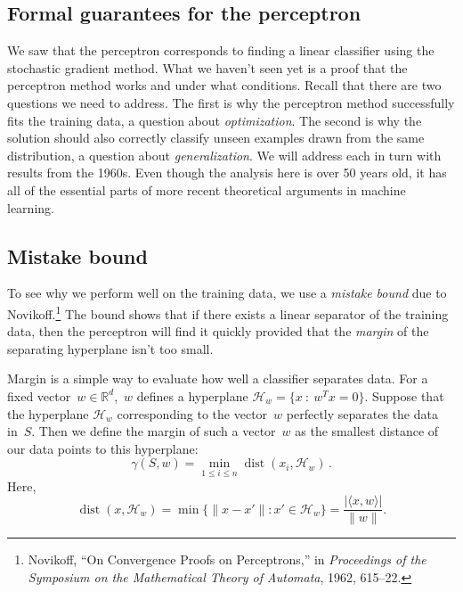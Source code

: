 \documentclass{tufte-book}
\begin{document}
\hypertarget{formal-guarantees-for-the-perceptron}{%
\subsection{Formal guarantees for the
perceptron}\label{formal-guarantees-for-the-perceptron}}

We saw that the perceptron corresponds to finding a linear classifier
using the stochastic gradient method. What we haven't seen yet is a
proof that the perceptron method works and under what conditions. Recall
that there are two questions we need to address. The first is why the
perceptron method successfully fits the training data, a question about
\emph{optimization}. The second is why the solution should also
correctly classify unseen examples drawn from the same distribution, a
question about \emph{generalization}. We will address each in turn with
results from the 1960s. Even though the analysis here is over 50 years
old, it has all of the essential parts of more recent theoretical
arguments in machine learning.

\hypertarget{mistake-bound}{%
\subsection{Mistake bound}\label{mistake-bound}}


To see why we perform well on the training data, we use a \emph{mistake
bound} due to Novikoff.\footnote{Novikoff, {``On Convergence Proofs on
  Perceptrons,''} in \emph{Proceedings of the Symposium on the
  Mathematical Theory of Automata}, 1962, 615--22.} The bound shows that
if there exists a linear separator of the training data, then the
perceptron will find it quickly provided that the \emph{margin} of the
separating hyperplane isn't too small.

Margin is a simple way to evaluate how well a classifier separates data.
For a fixed vector~\(w\in \mathbb{R}^d\),~\(w\) defines a hyperplane
\(\mathcal{H}_w = \{x~:~w^Tx=0\}\). Suppose that the hyperplane
\(\mathcal{H}_w\) corresponding to the vector~\(w\) perfectly separates
the data in~\(S\). Then we define the margin of such a vector~\(w\) as
the smallest distance of our data points to this hyperplane: \[
  \gamma(S,w) = \min_{1\le i\le n} \operatorname{dist}(x_i,\mathcal{H}_w )\,.
\] Here, \[
\operatorname{dist}(x, \mathcal{H}_w) = \min\{ \|x - x'\| \colon x'\in \mathcal{H}_w\}
= \frac{|\langle x, w\rangle|}{\|w\|}.
\]
\end{document}
